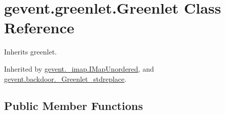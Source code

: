 \hypertarget{classgevent_1_1greenlet_1_1_greenlet}{}\section{gevent.\+greenlet.\+Greenlet Class Reference}
\label{classgevent_1_1greenlet_1_1_greenlet}


Inherits greenlet.



Inherited by \hyperlink{classgevent_1_1__imap_1_1_i_map_unordered}{gevent.\+\_\+imap.\+I\+Map\+Unordered}, and \hyperlink{classgevent_1_1backdoor_1_1___greenlet__stdreplace}{gevent.\+backdoor.\+\_\+\+Greenlet\+\_\+stdreplace}.

\subsection*{Public Member Functions}
